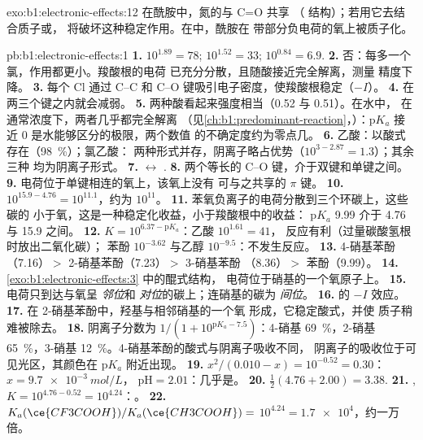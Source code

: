 \begin{solution}{exo:b1:electronic-effects:12}
在酰胺中，氮的与 C=O 共享
（ 结构）；若用它去结合质子或，
将破坏这种稳定作用。在中，酰胺在
带部分负电荷的氧上被质子化。
\end{solution}

\begin{solution}{pb:b1:electronic-effects:1}
\textbf{1.} $10^{1.89} = 78$; $10^{1.52} = 33$; $10^{0.84} = 6.9$.
\textbf{2.} 否：每多一个氯，作用都更小。羧酸根的电荷
已充分分散，且随酸接近完全解离，测量
精度下降。
\textbf{3.} 每个 Cl 通过 C--C 和 C--O
键吸引电子密度，使羧酸根稳定（$-I$）。
\textbf{4.} 在两三个键之内就会减弱。
\textbf{5.} 两种酸看起来强度相当（0.52 与 0.51）。在水中，
在通常浓度下，两者几乎都完全解离
（见\cref{ch:b1:predominant-reaction}，）：$\mathrm{p}K_a$ 接近 0
是水能够区分的极限，两个数值
的不确定度约为零点几。
\textbf{6.} 乙酸：以酸式存在（\qty{98}{\percent}）；氯乙酸：
两种形式并存，阴离子略占优势（$10^{3 - 2.87} = 1.3$）；其余三种
均为阴离子形式。
\textbf{7.}  $\leftrightarrow$ .
\textbf{8.} 两个等长的 C--O 键，介于双键和单键之间。
\textbf{9.} 电荷位于单键相连的氧上，该氧上没有
可与之共享的 $\pi$ 键。
\textbf{10.} $10^{15.9 - 4.76} = 10^{11.1}$，约为 $10^{11}$。
\textbf{11.} 苯氧负离子的电荷分散到三个环碳上，这些碳的
小于氧，这是一种稳定化收益，小于羧酸根中的收益：
$\mathrm{p}K_a$ 9.99 介于 4.76 与 15.9 之间。
\textbf{12.} $K = 10^{6.37 - \mathrm{p}K_a}$：乙酸 $10^{1.61} = 41$，
反应有利（过量碳酸氢根时放出二氧化碳）；
苯酚 $10^{-3.62}$ 与乙醇 $10^{-9.5}$：不发生反应。
\textbf{13.} 4-硝基苯酚（7.16）$>$ 2-硝基苯酚（7.23）$>$ 3-硝基苯酚
（8.36）$>$ 苯酚（9.99）。
\textbf{14.} \cref{exo:b1:electronic-effects:3} 中的醌式结构，
电荷位于硝基的一个氧原子上。
\textbf{15.} 电荷只到达与氧呈 \textit{邻位}和
\textit{对位}的碳上；连硝基的碳为 \textit{间位}。
\textbf{16.}  的 $-I$ 效应。
\textbf{17.} 在 2-硝基苯酚中，羟基与相邻硝基的一个氧
形成，它稳定酸式，并使
质子稍难被除去。
\textbf{18.} 阴离子分数为 $1/(1 + 10^{\mathrm{p}K_a - 7.5})$：4-硝基
\qty{69}{\percent}，2-硝基 \qty{65}{\percent}，3-硝基
\qty{12}{\percent}。4-硝基苯酚的酸式与阴离子吸收不同，
阴离子的吸收位于可见光区，其颜色在 $\mathrm{p}K_a$ 附近出现。
\textbf{19.} $x^2/(0.010 - x) = 10^{-0.52} = 0.30$：$x = \qty{9.7e-3}{mol/L}$，
$\mathrm{pH} = 2.01$：几乎是。
\textbf{20.} $\frac12(4.76 + 2.00) = 3.38$.
\textbf{21.} , $K = 10^{4.76 -
0.52} = 10^{4.24}$：。
\textbf{22.} $K_a(\ce{CF3COOH})/K_a(\ce{CH3COOH}) =$ \textbf{$10^{4.24} =
\num{1.7e4}$}，约一万倍。
\end{solution}
